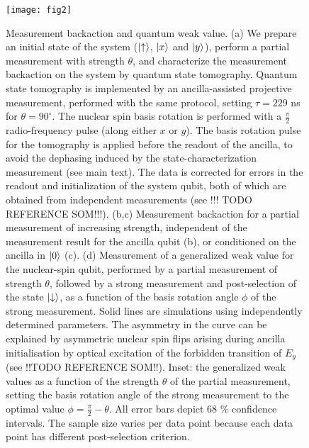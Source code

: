 \begin{figure}
	\texttt{[image: fig2]}
	\caption{\label{fig2} Measurement backaction and quantum weak value. (a) We prepare an initial state  of the system ($\left|\uparrow\right\rangle$,  $\left|x\right\rangle$ and  $\left|y\right\rangle$), perform a partial measurement with strength $\theta$, and characterize the measurement backaction on the system by quantum state tomography. Quantum state tomography is implemented by an ancilla-assisted projective measurement, performed with the same protocol, setting $\tau = 229$ ns for $\theta = 90^{\circ}$. The nuclear spin basis rotation is performed with a $\frac{\pi}{2}$ radio-frequency pulse (along either $x$ or $y$). The basis rotation pulse for the tomography is applied before the readout of the ancilla, to avoid the dephasing induced by the state-characterization measurement (see main text). The data is corrected for errors in the readout and initialization of the system qubit, both of which are obtained from independent measurements (see !!! TODO REFERENCE SOM!!!). (b,c)  Measurement backaction for a partial measurement of increasing strength, independent of the measurement result for the ancilla qubit (b), or conditioned on the ancilla in  $\left|0\right\rangle$ (c). (d) Measurement of a generalized weak value for the nuclear-spin qubit, performed by a partial measurement of strength $\theta$, followed by a strong measurement and post-selection of the state  $\left|\downarrow\right\rangle$, as a function of the basis rotation angle $\phi$ of the strong measurement. Solid lines are simulations using independently determined parameters. The asymmetry in the curve can be explained by asymmetric nuclear spin flips arising during ancilla initialisation by optical excitation of the forbidden transition of $E_{y}$ (see !!TODO REFERENCE SOM!!). Inset: the generalized weak values as a function of the strength $\theta$ of the partial measurement, setting the basis rotation angle of the strong measurement to the optimal value  $\phi = \frac{\pi}{2} - \theta$. All error bars depict 68 $\%$ confidence intervals. The sample size varies per data point because each data point has different post-selection criterion.}
\end{figure}

